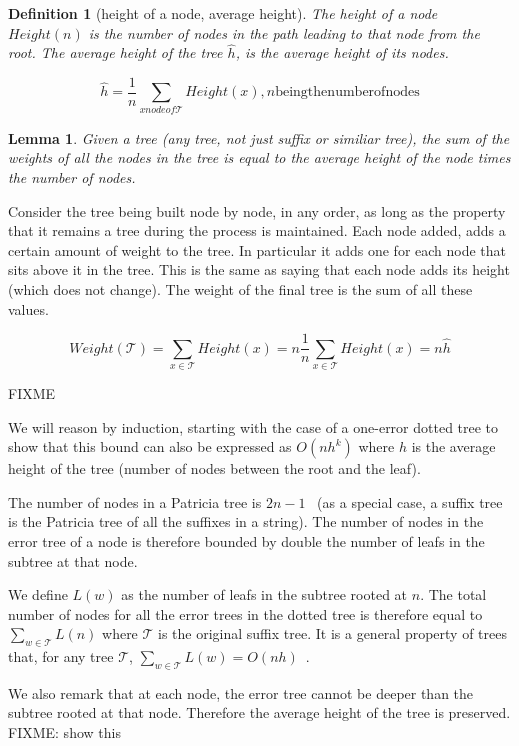 \documentclass[letter,10pt]{article}
\newtheorem{definition}{Definition}
\newtheorem{lemma}{Lemma}
\begin{document}
\begin{definition}[height of a node, average height]
The height of a node $\mathit{Height}(n)$ is the number of nodes in the path leading to that node from the root. The average height of the tree $\hat{h}$, is the average height of its nodes.

\[ \hat{h} = \frac{1}{n} \sum_{x \mathit{node of \mathcal{T}}} \mathit{Height}(x), n \mathrm{being the number of nodes} \]
\end{definition}

\begin{lemma}
Given a tree (any tree, not just suffix or similiar tree), the sum of the weights of all the nodes in the tree is equal to the average height of the node times the number of nodes.
\end{lemma}

Consider the tree being built node by node, in any order, as long as the property that it remains a tree during the process is maintained. Each node added, adds a certain amount of weight to the tree. In particular it adds one for each node that sits above it in the tree. This is the same as saying that each node adds its height (which does not change). The weight of the final tree is the sum of all these values.

\[ \mathit{Weight}(\mathcal{T}) = \sum_{x \in \mathcal{T}}\mathit{Height}(x) = n\frac{1}{n}\sum_{x \in \mathcal{T}}\mathit{Height}(x) = n\hat{h} \]

FIXME

We will reason by induction, starting with the case of a one-error dotted tree to show that this bound can also be expressed as $O(nh^k)$ where $h$ is the average height of the tree (number of nodes between the root and the leaf).

The number of nodes in a Patricia tree is $2n-1$~\cite{patricia} (as a special case, a suffix tree is the Patricia tree of all the suffixes in a string). The number of nodes in the error tree of a node is therefore bounded by double the number of leafs in the subtree at that node.

We define $L(w)$ as the number of leafs in the subtree rooted at $n$. The total number of nodes for all the error trees in the dotted tree is therefore equal to $\sum_{w \in \mathcal{T}}L(n)$ where $\mathcal{T}$ is the original suffix tree. It is a general property of trees that, for any tree $\mathcal{T}$, $\sum_{w \in \mathcal{T}}L(w) = O(nh)$~\cite{whatever}.

We also remark that at each node, the error tree cannot be deeper than the subtree rooted at that node. Therefore the average height of the tree is preserved. FIXME: show this
\end{document}
